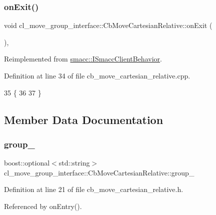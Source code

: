 \subsubsection{\texorpdfstring{on\+Exit()}{onExit()}}
{\footnotesize\ttfamily void cl\+\_\+move\+\_\+group\+\_\+interface\+::\+Cb\+Move\+Cartesian\+Relative\+::on\+Exit (\begin{DoxyParamCaption}{ }\end{DoxyParamCaption})\hspace{0.3cm}{\ttfamily [override]}, {\ttfamily [virtual]}}



Reimplemented from \hyperlink{classsmacc_1_1ISmaccClientBehavior_a36bf771905e3bf750909a15e4215a9b3}{smacc\+::\+I\+Smacc\+Client\+Behavior}.



Definition at line 34 of file cb\+\_\+move\+\_\+cartesian\+\_\+relative.\+cpp.


\begin{DoxyCode}
35 \{
36     
37 \}
\end{DoxyCode}


\subsection{Member Data Documentation}
\mbox{\label{classcl__move__group__interface_1_1CbMoveCartesianRelative_a194d8357267ccd5ee0a10200f1c4cae0}} 
\subsubsection{\texorpdfstring{group\+\_\+}{group\_}}
{\footnotesize\ttfamily boost\+::optional$<$std\+::string$>$ cl\+\_\+move\+\_\+group\+\_\+interface\+::\+Cb\+Move\+Cartesian\+Relative\+::group\+\_\+}



Definition at line 21 of file cb\+\_\+move\+\_\+cartesian\+\_\+relative.\+h.



Referenced by on\+Entry().

